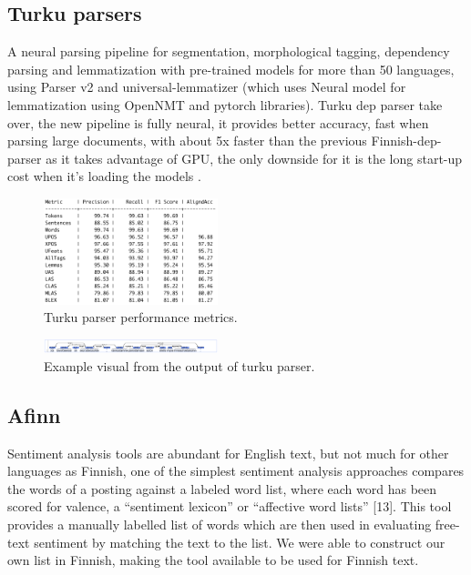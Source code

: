 \documentclass[conference]{IEEEtran}
\begin{document}
\subsection{Turku parsers}
A neural parsing pipeline for segmentation, morphological tagging, dependency parsing and lemmatization with pre-trained models for more than 50 languages, using Parser v2 and universal-lemmatizer (which uses Neural model for lemmatization using OpenNMT and pytorch libraries). Turku dep parser take over, the new pipeline is fully neural, it provides better accuracy, fast when parsing large documents, with about 5x faster than the previous Finnish-dep-parser as it takes advantage of GPU, the only downside for it is the long start-up cost when it’s loading the models \cite{kanerva2018turku}.

\begin{figure}[htbp]
    \centerline{\includegraphics[width=0.45\textwidth]{figures/fig1.png}}
    \caption{Turku parser performance metrics.}
    \label{turku_parser_performance}
\end{figure}

\begin{figure}[htbp]
    \centerline{\includegraphics[width=0.45\textwidth]{figures/fig2.png}}
    \caption{Example visual from the output of turku parser.}
    \label{turku_parser_example}
\end{figure}

\subsection{Afinn}
Sentiment analysis tools are abundant for English text, but not much for other languages as Finnish, one of the simplest sentiment analysis approaches compares the words of a posting against a labeled word list, where each word has been scored for valence, a “sentiment lexicon” or “affective word lists” [13]. This tool provides a manually labelled list of words which are then used in evaluating free-text sentiment by matching the text to the list. We were able to construct our own list in Finnish, making the tool available to be used for Finnish text.
\end{document}
